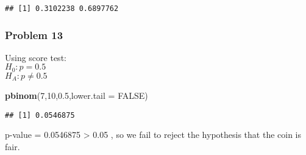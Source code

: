 \documentclass[]{article}
\newenvironment{Shaded}{\begin{snugshade}}{\end{snugshade}}
\newcommand{\KeywordTok}[1]{\textcolor[rgb]{0.13,0.29,0.53}{\textbf{#1}}}
\newcommand{\DataTypeTok}[1]{\textcolor[rgb]{0.13,0.29,0.53}{#1}}
\newcommand{\DecValTok}[1]{\textcolor[rgb]{0.00,0.00,0.81}{#1}}
\newcommand{\FloatTok}[1]{\textcolor[rgb]{0.00,0.00,0.81}{#1}}
\newcommand{\OtherTok}[1]{\textcolor[rgb]{0.56,0.35,0.01}{#1}}
\newcommand{\NormalTok}[1]{#1}
\begin{document}
\begin{verbatim}
## [1] 0.3102238 0.6897762
\end{verbatim}

\subsubsection{Problem 13}\label{problem-13}

Using score test:\\
\(H_0 : p=0.5\)\\
\(H_A : p\neq0.5\)

\begin{Shaded}
\begin{Highlighting}[]
\KeywordTok{pbinom}\NormalTok{(}\DecValTok{7}\NormalTok{,}\DecValTok{10}\NormalTok{,}\FloatTok{0.5}\NormalTok{,}\DataTypeTok{lower.tail =} \OtherTok{FALSE}\NormalTok{)}
\end{Highlighting}
\end{Shaded}

\begin{verbatim}
## [1] 0.0546875
\end{verbatim}

p-value = 0.0546875 \textgreater{} 0.05 , so we fail to reject the
hypothesis that the coin is fair.
\end{document}
